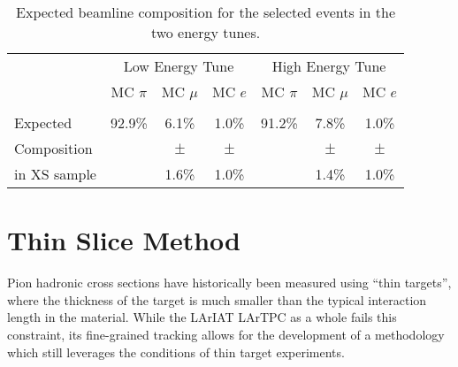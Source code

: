 \documentclass[%
 floatfix,
 reprint,
 twocolumn,
superscriptaddress,
showpacs,preprintnumbers,
 amsmath,amssymb,
 aps,
prd,
]{revtex4-1}
\begin{document}
\begin{table}
\caption{\label{tab:MCafterCutContaminants}Expected beamline composition for the selected events in the two energy tunes.}
\begin{ruledtabular}
\begin{tabular}{ l | c | c | c || c | c | c |}
 &  \multicolumn{3}{c||}{Low Energy Tune} & \multicolumn{3}{c|}{High Energy Tune }\\
& MC $\pi$  & MC  $ \mu$ & MC  $e$ & MC  $\pi$ & MC  $\mu$ & MC  $e$ \\
\hline
&  &  &  & & &\\  
Expected&  92.9\%   & 6.1\%    & 1.0\%   & 91.2\%	& 7.8\%  & 1.0\%\\
Composition              &                      &$\pm$                       &$\pm$                   &                       &$\pm$                        &$\pm$\\  
in XS sample &                      &1.6\%&          1.0\% &                   &                 1.4\%&    1.0\%\\  
\end{tabular}
\end{ruledtabular}
\end{table}



\section{\label{sec:ThinSliceMethod}{Thin Slice Method}}
Pion hadronic cross sections have historically been measured  using ``thin targets'', where the thickness of the target is much smaller than the typical interaction length in the material. While the LArIAT LArTPC as a whole fails this constraint, its fine-grained tracking allows for the development of a methodology which still leverages the conditions of thin target experiments. 
\end{document}
